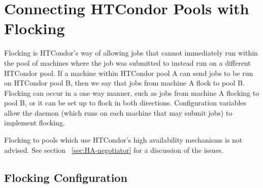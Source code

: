 \section{\label{sec:Flocking}Connecting HTCondor Pools with Flocking}

Flocking is HTCondor's way of allowing jobs that cannot immediately
run within the pool of machines where the job was
submitted to instead run on a different HTCondor pool. 
If a machine within HTCondor pool A can send jobs to be run on HTCondor pool B,
then we say that jobs from machine A flock to pool B.
Flocking can occur in a one way manner,
such as jobs from machine A flocking to pool B,
or it can be set up to flock in both directions. 
Configuration variables allow the
 daemon (which runs on each machine
that may submit jobs) to implement flocking.

\Note Flocking to pools which use HTCondor's high availability mechanisms
is not advised.
See section ~\ref{sec:HA-negotiator} 
for a discussion of the issues.


\subsection{\label{sec:Configure-Flocking}Flocking Configuration}

